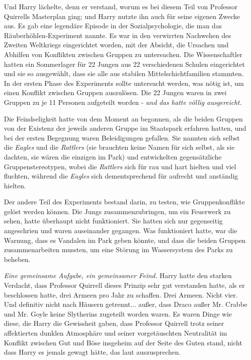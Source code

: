 Und Harry lächelte, denn er verstand, worum es bei diesem Teil von Professor
Quirrells Masterplan ging; und Harry nutzte ihn auch für seine eigenen Zwecke
aus. Es gab eine legendäre Episode in der Sozialpsychologie, die man das
Räuberhöhlen-Experiment nannte. Es war in den verwirrten Nachwehen des Zweiten
Weltkriegs eingerichtet worden, mit der Absicht, die Ursachen und Abhilfen von
Konflikten zwischen Gruppen zu untersuchen. Die Wissenschaftler hatten ein
Sommerlager für 22 Jungen aus 22 verschiedenen Schulen eingerichtet und sie so
ausgewählt, dass sie alle aus stabilen Mittelschichtfamilien stammten. In der
ersten Phase des Experiments sollte untersucht werden, was nötig ist, um einen
Konflikt zwischen Gruppen auszulösen. Die 22 Jungen waren in zwei Gruppen zu je
11 Personen aufgeteilt worden - \emph{und das hatte völlig ausgereicht.}

Die Feindseligkeit hatte von dem Moment an begonnen, als die beiden Gruppen von
der Existenz der jeweils anderen Gruppe im Staatspark erfahren hatten, und bei
der ersten Begegnung waren Beleidigungen gefallen. Sie nannten sich selbst die
\emph{Eagles} und die \emph{Rattlers} (sie brauchten keine Namen für sich
selbst, als sie dachten, sie wären die einzigen im Park) und entwickelten
gegensätzliche Gruppenstereotypen, wobei die \emph{Rattlers} sich für rau und
hart hielten und viel fluchten, während die \emph{Eagles} sich dementsprechend
für aufrecht und anständig hielten.

Der andere Teil des Experiments bestand darin, zu testen, wie Gruppenkonflikte
gelöst werden können. Die Jungs zusammenzubringen, um ein Feuerwerk zu sehen,
hatte überhaupt nicht funktioniert. Sie hatten sich nur gegenseitig angeschrien
und waren auseinander gegangen. Was funktioniert hatte, war die Warnung, dass es
Vandalen im Park geben könnte, und dass die beiden Gruppen zusammenarbeiten
mussten, um eine Störung im Wassersystem des Parks zu beheben.

\emph{Eine gemeinsame Aufgabe, ein gemeinsamer Feind.} Harry hatte den starken
Verdacht, dass Professor Quirrell dieses Prinzip sehr gut verstanden hatte, als
er beschlossen hatte, drei Armeen pro Jahr zu schaffen. Drei Armeen. Nicht vier.
Und definitiv nicht nach Häusern getrennt... außer, dass Draco außer Mr. Crabbe
und Mr. Goyle keine Slytherins zugeteilt worden waren. Es waren Dinge wie diese,
die Harry die Gewissheit gaben, dass Professor Quirrell trotz seiner
affektierten dunklen Atmosphäre und seiner vorgetäuschten Neutralität im
Konflikt zwischen Gut und Böse insgeheim auf der Seite des Guten stand, nicht
dass Harry es jemals gewagt hätte, das laut auszusprechen.

